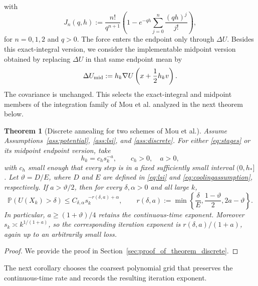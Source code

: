 \documentclass[11pt]{article}
\newtheorem{theorem}{Theorem}[section]
\theoremstyle{definition}
\begin{document}
with
\[
 J_n(q,h):=\frac{n!}{q^{n+1}}
 \left(1-e^{-qh}\sum_{j=0}^n\frac{(qh)^j}{j!}\right),
\]
for $n=0,1,2$ and $q>0$.
The force enters the endpoint only through $\Delta U$. Besides this exact-integral
version, we consider the implementable midpoint version obtained by replacing
$\Delta U$ in that same endpoint mean by
\begin{equation}\label{eq:midpoint}
 \Delta U_{\rm mid}:=h_k\nabla U\left(x+\frac12h_kv\right).
\end{equation}
The covariance is unchanged. This selects the exact-integral and midpoint
members of the integration family of Mou et al. \cite{MouEtAl2021} analyzed 
in the next theorem below.

\begin{theorem}[Discrete annealing for two schemes of Mou et al.]\label{thm:discrete}
Assume Assumptions~\ref{ass:potential}, \ref{ass:lsi}, and \ref{ass:discrete}.
For either \eqref{eq:stages} or its midpoint endpoint version, take
\[
 h_k=c_hs_k^{-a},\qquad c_h>0,\quad a>0,
\]
with $c_h$ small enough that every step is in a fixed sufficiently small
interval $(0,h_*]$. Let $\vartheta=D/E$, where $D$ and $E$ are defined in
\eqref{eq:lsi} and \eqref{eq:coolingassumption}, respectively.
If $a>\vartheta/2$, then for every
$\delta,\alpha>0$ and all large $k$,
\begin{equation}\label{eq:discreterate}
 \mathbb P\left(U(X_k)>\delta\right)
 \leq C_{\delta,\alpha}s_k^{-r(\delta,a)+\alpha},\qquad
 r(\delta,a):=\min\left\{\frac\delta E,
                   \frac{1-\vartheta}{2},2a-\vartheta\right\}.
\end{equation}
In particular, $a\geq(1+\vartheta)/4$ retains the continuous-time exponent.
Moreover $s_k\asymp k^{1/(1+a)}$, so the corresponding iteration exponent is
$r(\delta,a)/(1+a)$, again up to an arbitrarily small loss.
\end{theorem}

\begin{proof}
    We provide the proof in Section~\ref{sec:proof_of_theorem_discrete}.
\end{proof}

The next corollary chooses the coarsest polynomial grid that preserves the
continuous-time rate and records the resulting iteration exponent.
\end{document}
